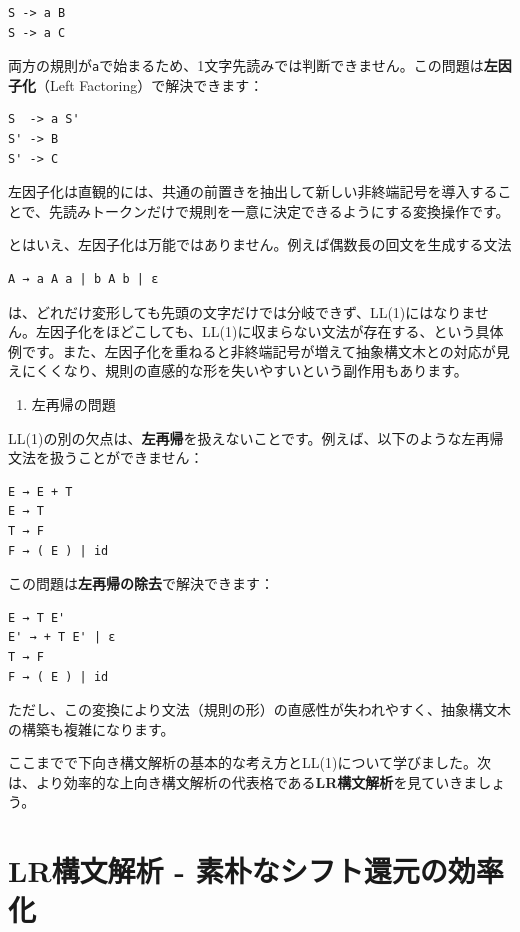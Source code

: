 \begin{verbatim}
S -> a B
S -> a C
\end{verbatim}

両方の規則が\texttt{a}で始まるため、1文字先読みでは判断できません。この問題は\textbf{左因子化}（Left
Factoring）で解決できます：

\begin{verbatim}
S  -> a S'
S' -> B
S' -> C
\end{verbatim}

左因子化は直観的には、共通の前置きを抽出して新しい非終端記号を導入することで、先読みトークンだけで規則を一意に決定できるようにする変換操作です。

とはいえ、左因子化は万能ではありません。例えば偶数長の回文を生成する文法

\begin{verbatim}
A → a A a | b A b | ε
\end{verbatim}

は、どれだけ変形しても先頭の文字だけでは分岐できず、LL(1)にはなりません。左因子化をほどこしても、LL(1)に収まらない文法が存在する、という具体例です。また、左因子化を重ねると非終端記号が増えて抽象構文木との対応が見えにくくなり、規則の直感的な形を失いやすいという副作用もあります。

\begin{enumerate}
\def\labelenumi{\arabic{enumi}.}
\setcounter{enumi}{1}
\tightlist
\item
  左再帰の問題
\end{enumerate}

LL(1)の別の欠点は、\textbf{左再帰}を扱えないことです。例えば、以下のような左再帰文法を扱うことができません：

\begin{verbatim}
E → E + T
E → T
T → F
F → ( E ) | id
\end{verbatim}

この問題は\textbf{左再帰の除去}で解決できます：

\begin{verbatim}
E → T E'
E' → + T E' | ε
T → F
F → ( E ) | id
\end{verbatim}

ただし、この変換により文法（規則の形）の直感性が失われやすく、抽象構文木の構築も複雑になります。

ここまでで下向き構文解析の基本的な考え方とLL(1)について学びました。次は、より効率的な上向き構文解析の代表格である\textbf{LR構文解析}を見ていきましょう。

\hypertarget{chapter5-lrux69cbux6587ux89e3ux6790---ux7d20ux6734ux306aux30b7ux30d5ux30c8ux9084ux5143ux306eux52b9ux7387ux5316}{%
\section{LR構文解析 -
素朴なシフト還元の効率化}\label{chapter5-lrux69cbux6587ux89e3ux6790---ux7d20ux6734ux306aux30b7ux30d5ux30c8ux9084ux5143ux306eux52b9ux7387ux5316}}

